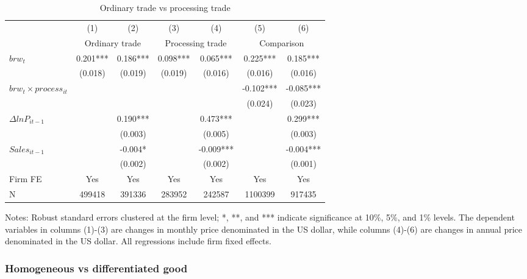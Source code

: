 \begin{table}[h]
    \centering
    \caption{Ordinary trade vs processing trade}
    \begin{threeparttable}
    \begin{tabular}{lcccccc}
        \toprule
        & (1)   & (2)   & (3)   & (4)   & (5)   & (6) \\
          & \multicolumn{2}{c}{Ordinary trade}  & \multicolumn{2}{c}{Processing trade} & \multicolumn{2}{c}{Comparison}\\
        \midrule
        $brw_t$   & 0.201*** & 0.186*** & 0.098*** & 0.065*** & 0.225*** & 0.185*** \\
              & (0.018) & (0.019) & (0.019) & (0.016) & (0.016) & (0.016) \\
        $brw_t \times process_{it}$ &       &       &       &       & -0.102*** & -0.085*** \\
              &       &       &       &       & (0.024) & (0.023) \\
        $\Delta ln P_{it-1}$ &       & 0.190*** &       & 0.473*** &       & 0.299*** \\
              &       & (0.003) &       & (0.005) &       & (0.003) \\
        $Sales_{it-1}$ &       & -0.004* &       & -0.009*** &       & -0.004*** \\
              &       & (0.002) &       & (0.002) &       & (0.001) \\
        Firm FE & Yes   & Yes   & Yes   & Yes   & Yes   & Yes \\
        N     & 499418 & 391336 & 283952 & 242587 & 1100399 & 917435 \\
        \bottomrule
    \end{tabular}
        \begin{tablenotes}
            \footnotesize
            \item Notes: Robust standard errors clustered at the firm level;  *, **, and *** indicate significance at 10\%, 5\%, and 1\% levels. The dependent variables in columns (1)-(3) are changes in monthly price denominated in the US dollar, while columns (4)-(6) are changes in annual price denominated in the US dollar. All regressions include firm fixed effects.
	\end{tablenotes}
    \end{threeparttable}
    \label{tab.process}
\end{table}

\subsubsection{Homogeneous vs differentiated good}

